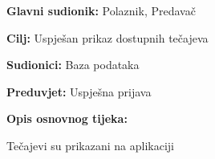 				\noindent {}
				\begin{packed_item}
					
					\item \textbf{Glavni sudionik:} Polaznik, Predavač
					\item  \textbf{Cilj:} Uspješan prikaz dostupnih tečajeva
					\item  \textbf{Sudionici:} Baza podataka
					\item  \textbf{Preduvjet:} Uspješna prijava
					\item  \textbf{Opis osnovnog tijeka:}
					
					\item[] \begin{packed_enum}
						
						\item Tečajevi su prikazani na aplikaciji
						
					\end{packed_enum}
					
				\end{packed_item}
			
